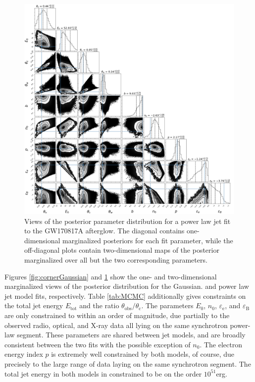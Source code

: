 \documentclass[twocolumn]{aastex62}
\newcommand{\gwbns}{GW170817A}
\newcommand{\thobs}{\ensuremath{\theta_{\mathrm{obs}}}}
\newcommand{\thC}{\ensuremath{\theta_{\mathrm{c}}}}
\newcommand{\epse}{\ensuremath{\varepsilon_{\mathrm{e}}}}
\newcommand{\epsB}{\ensuremath{\varepsilon_{\mathrm{B}}}}
\newcommand{\Etot}{\ensuremath{E_{\mathrm{tot}}}}
\begin{document}
\begin{figure}
	\includegraphics[width=\textwidth]{figs/cornerPowerlaw.png}
	\caption{Views of the posterior parameter distribution for a power law jet fit to the \gwbns{} afterglow.  The diagonal contains one-dimensional marginalized posteriors for each fit parameter, while the off-diagonal plots contain two-dimensional maps of the posterior marginalized over all but the two corresponding parameters. \label{fig:cornerPowerlaw}}
\end{figure}

Figures \ref{fig:cornerGaussian} and \ref{fig:cornerPowerlaw} show the one- and two-dimensional marginalized views of the posterior distribution for the Gaussian. and power law jet model fits, respectively.  Table \ref{tab:MCMC} additionally gives constraints on the total jet energy \Etot{} and the ratio $\thobs/\thC$. The parameters $E_0$, $n_0$, $\epse$, and $\epsB$ are only constrained to within an order of magnitude, due partially to the observed radio, optical, and X-ray data all lying on the same synchrotron power-law segment.  These parameters are shared between jet models, and are broadly consistent between the two fits with the possible exception of $n_0$.  The electron energy index $p$ is extremely well constrained by both models, of course, due precisely to the large range of data laying on the same synchrotron segment.  The total jet energy in both models in constrained to be on the order $10^{51}$erg.
\end{document}
